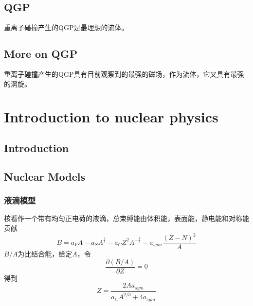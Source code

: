 \documentclass[a4paper,11pt]{ctexart}
\newcommand{\beq}{\begin{equation}}
\newcommand{\eeq}{\end{equation}}
\begin{document}
\subsection{QGP}
重离子碰撞产生的QGP是最理想的流体。
\subsection{More on QGP}
重离子碰撞产生的QGP具有目前观察到的最强的磁场，作为流体，它又具有最强的涡旋。



\section{Introduction to nuclear physics}
\subsection{Introduction}
\subsection{Nuclear Models}
\subsubsection{液滴模型}
核看作一个带有均匀正电荷的液滴，总束缚能由体积能，表面能，静电能和对称能贡献
\beq
B = a_V A - a_S A^{\frac{2}{3}} - a_C Z^2 A^{-\frac{1}{3}} - a_{sym} \frac{(Z - N)^2}{A}
\eeq
$B/A$为比结合能，给定$A$，令
\beq
\frac{\partial \left( B/A \right)}{\partial Z} = 0
\eeq
得到
\beq
Z = \frac{2Aa_{sym}}{a_C A^{2/3} + 4a_{sym}}
\eeq
\end{document}
